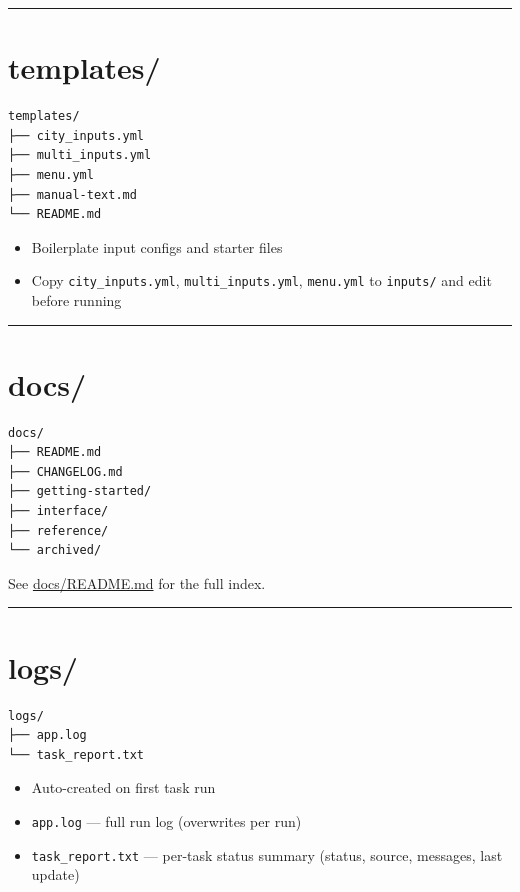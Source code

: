 \documentclass[
  letterpaper,
  DIV=11,
  numbers=noendperiod]{scrreprt}
\providecommand{\tightlist}{%
  \setlength{\itemsep}{0pt}\setlength{\parskip}{0pt}}
\begin{document}
\begin{center}\rule{0.5\linewidth}{0.5pt}\end{center}

\section{templates/}\label{templates}

\begin{verbatim}
templates/
├── city_inputs.yml
├── multi_inputs.yml
├── menu.yml
├── manual-text.md
└── README.md
\end{verbatim}

\begin{itemize}
\tightlist
\item
  Boilerplate input configs and starter files
\item
  Copy \texttt{city\_inputs.yml}, \texttt{multi\_inputs.yml},
  \texttt{menu.yml} to \texttt{inputs/} and edit before running
\end{itemize}

\begin{center}\rule{0.5\linewidth}{0.5pt}\end{center}

\section{docs/}\label{docs}

\begin{verbatim}
docs/
├── README.md
├── CHANGELOG.md
├── getting-started/
├── interface/
├── reference/
└── archived/
\end{verbatim}

See \href{../README.md}{docs/README.md} for the full index.

\begin{center}\rule{0.5\linewidth}{0.5pt}\end{center}

\section{logs/}\label{logs}

\begin{verbatim}
logs/
├── app.log
└── task_report.txt
\end{verbatim}

\begin{itemize}
\tightlist
\item
  Auto-created on first task run
\item
  \texttt{app.log} --- full run log (overwrites per run)
\item
  \texttt{task\_report.txt} --- per-task status summary (status, source,
  messages, last update)
\end{itemize}
\end{document}
